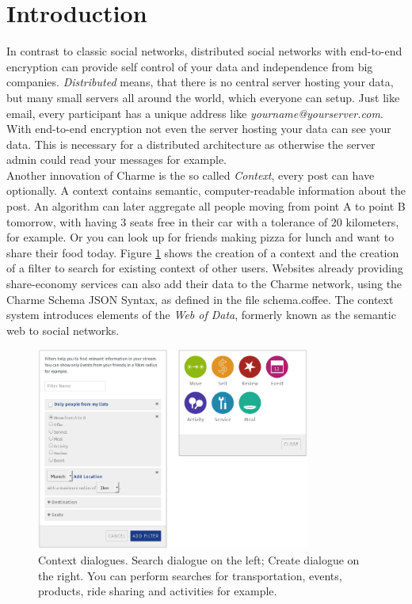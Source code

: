 \documentclass{scrartcl}
\begin{document}
\newpage
\section{Introduction}
In contrast to classic social networks, distributed social networks with end-to-end encryption can provide self control of your data and  independence from big companies.  \textit{Distributed} means, that there is no central server hosting your data, but many small servers all around the world, which everyone can  setup. Just like email, every participant has a unique address like \textit{yourname@yourserver.com}. With end-to-end encryption not even the server hosting your data can see your data. This is necessary for a distributed architecture as otherwise the server admin could read your messages for example.\\

Another innovation of Charme is the so called \textit{Context}, every post can have optionally. A context contains semantic, computer-readable information about the post.
 An algorithm can later aggregate all people moving from point A to point B tomorrow, with having 3 seats free in their car with a tolerance of 20 kilometers, for example. Or you can look up for friends making pizza for lunch and want to share their food today. Figure \ref{figContext} shows the creation of a context and the creation of a filter to search for existing context of other users. 
 Websites already providing share-economy services can also add their data to the Charme network, using the Charme Schema JSON Syntax, as defined in the file schema.coffee. The context system introduces elements of the \textit{Web of Data}, formerly known as the semantic web to social networks.

\begin{figure}[ht]
	\centering
  \includegraphics[width=90mm]{illustrations/context.jpg}
	\caption{Context dialogues. Search dialogue on the left; Create dialogue on the right. You can perform searches for transportation, events, products, ride sharing and activities for example.}
	\label{figContext}
\end{figure}
\newpage
\end{document}
